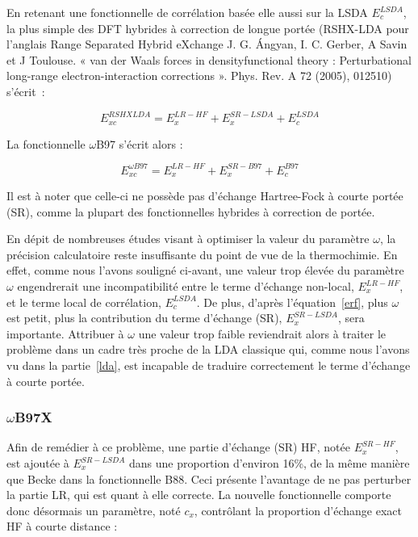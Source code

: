 \documentclass[12pt,a4paper]{book}
\begin{document}
	En retenant une fonctionnelle de corrélation basée elle aussi sur la LSDA $E_{c}^{LSDA}$, la plus simple des DFT hybrides à correction de longue portée (RSHX-LDA pour l’anglais \og Range Separated Hybrid eXchange \fg{} J. G. Ángyan, I. C. Gerber, A Savin et J Toulouse. « van der Waals forces in densityfunctional theory : Perturbational long-range electron-interaction corrections ». Phys. Rev. A 72 (2005), 012510) s'écrit~:
	
	\begin{equation}
	E_{xc}^{RSHXLDA} = E_{x}^{LR-HF} + E_{x}^{SR-LSDA} + E_{c}^{LSDA}
	\end{equation}
	
	La fonctionnelle $\omega$B97\cite{chai2008long} s'écrit alors :
	
	\begin{equation}
	E_{xc}^{\omega B97} = E_{x}^{LR-HF} + E_{x}^{SR-B97} + E_{c}^{B97}
	\end{equation}
	
	Il est à noter que celle-ci ne possède pas d'échange Hartree-Fock à courte portée (SR), comme la plupart des fonctionnelles hybrides à correction de portée.
	
	En dépit de nombreuses études visant à optimiser la valeur du paramètre $\omega$, la précision calculatoire reste insuffisante du point de vue de la thermochimie. En effet, comme nous l'avons souligné ci-avant, une valeur trop élevée du paramètre $\omega$ engendrerait une incompatibilité entre le terme d'échange non-local, $E_{x}^{LR-HF}$, et le terme local de corrélation, $E_{c}^{LSDA}$. De plus, d'après l'équation~\ref{erf}, plus $\omega$ est petit, plus la contribution du terme d'échange (SR), $E_{x}^{SR-LSDA}$, sera importante. Attribuer à $\omega$ une valeur trop faible reviendrait alors à traiter le problème dans un cadre très proche de la LDA classique qui, comme nous l'avons vu dans la partie~\ref{lda}, est incapable de traduire correctement le terme d'échange à courte portée.
	
	\subsubsection{$\omega$B97X}
	
	Afin de remédier à ce problème, une partie d'échange (SR) HF, notée $E_{x}^{SR-HF}$, est ajoutée à $E_{x}^{SR-LSDA}$ dans une proportion d'environ 16\%, de la même manière que Becke dans la fonctionnelle B88. Ceci présente l'avantage de ne pas perturber la partie LR, qui est quant à elle correcte. La nouvelle fonctionnelle comporte donc désormais un paramètre, noté $c_{x}$, contrôlant la proportion d'échange exact HF à courte distance :
	
\end{document}
